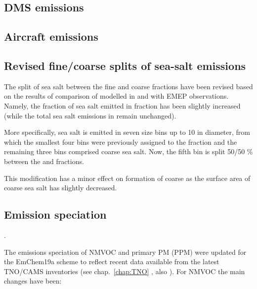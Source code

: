 
\subsection{DMS emissions}
\label{ssec:DMS}


\subsection{Aircraft emissions}
\label{ssec:Aircraft}



\subsection{Revised fine/coarse splits of sea-salt emissions}
\label{ssec:updateSS}

The split of sea salt between the fine and coarse fractions have been revised based on the results of comparison of modelled  in \PM[2.5] and \PM[10] with EMEP observations. Namely, the fraction of sea salt emitted in \PM[2.5] fraction has been slightly increased (while the total sea salt emissions in \PM[10] remain unchanged). 

More specifically, sea salt is emitted in seven size bins up to 10 \um in diameter, from which the smallest four bins were previously assigned to the \PM[2.5] fraction and the remaining three bins comprised coarse sea salt. Now, the fifth bin is split 50/50 \% between the \PM[2.5] and \PM[2.5-10] fractions.  


This modification has a minor effect on formation of coarse \noiii as the surface area of coarse sea salt has slightly decreased.



\subsection{Emission speciation}
\label{ssec:emissplits}.


The emissions speciation of NMVOC and primary PM (PPM) were updated
for the EmChem19a scheme to reflect recent data available from
the latest TNO/CAMS inventories (see chap.~\ref{chap:TNO} 
, also
\citealt{CAMSemis2019}).  For NMVOC the main changes have been:

